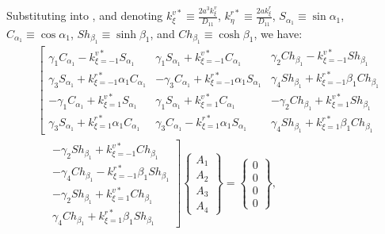 \documentclass[preprint,12pt,number]{elsarticle}
\begin{document}
Substituting  into , and denoting 
$k^{v*}_{\xi} \equiv \frac{2a^3 k^v_{\xi}}{D_{11}} $, 
$ k^{r*}_{\eta} \equiv \frac{2a k^r_{\xi}}{D_{11}} $, 
$ S_{\alpha_1} \equiv \sin \alpha_1 $, 
$ C_{\alpha_1} \equiv \cos \alpha_1 $, 
$ Sh_{\beta_1} \equiv \sinh \beta_1$, 
and $ Ch_{\beta_1} \equiv \cosh \beta_1 $, we have:
%
\begin{equation}\label{eq:ABx}
\begin{split}
	&\left[ \begin{array}{c}
		\gamma_1 C_{\alpha_1} - k^{v*}_{\xi=-1} S_{\alpha_1} \\ 
		\gamma_3 S_{\alpha_1} + k^{r*}_{\xi=-1} \alpha_1 C_{\alpha_1} \\ 
		-\gamma_1 C_{\alpha_1} + k^{v*}_{\xi=1} S_{\alpha_1} \\ 
		\gamma_3 S_{\alpha_1} + k^{r*}_{\xi=1} \alpha_1 C_{\alpha_1}
	\end{array} 
	\begin{array}{c}
		\gamma_1 S_{\alpha_1} + k^{v*}_{\xi=-1} C_{\alpha_1} \\ 
		-\gamma_3 C_{\alpha_1} + k^{r*}_{\xi=-1} \alpha_1 S_{\alpha_1} \\ 
		\gamma_1 S_{\alpha_1} + k^{v*}_{\xi=1} C_{\alpha_1} \\ 
		\gamma_3 C_{\alpha_1} - k^{r*}_{\xi=1} \alpha_1 S_{\alpha_1}
	\end{array} 
	\begin{array}{c}
		\gamma_2 Ch_{\beta_1} - k^{v*}_{\xi=-1} Sh_{\beta_1} \\ 
		\gamma_4 Sh_{\beta_1} + k^{r*}_{\xi=-1} \beta_1 Ch_{\beta_1} \\ 
		-\gamma_2 Ch_{\beta_1} + k^{v*}_{\xi=1} Sh_{\beta_1} \\ 
		\gamma_4 Sh_{\beta_1} + k^{r*}_{\xi=1} \beta_1 Ch_{\beta_1}
	\end{array} \right. \\ 
	&\quad
	\left. \begin{array}{c}
		-\gamma_2 Sh_{\beta_1} + k^{v*}_{\xi=-1} Ch_{\beta_1} \\ 
		-\gamma_4 Ch_{\beta_1} - k^{r*}_{\xi=-1} \beta_1 Sh_{\beta_1} \\ 
		-\gamma_2 Sh_{\beta_1} + k^{v*}_{\xi=1} Ch_{\beta_1} \\ 
		\gamma_4 Ch_{\beta_1} + k^{r*}_{\xi=1} \beta_1 Sh_{\beta_1}
	\end{array} \right] \begin{Bmatrix}
		A_1 \\ A_2 \\ A_3 \\ A_4
	\end{Bmatrix} =  \begin{Bmatrix}
		0 \\ 0 \\ 0 \\ 0
	\end{Bmatrix},
\end{split}
\end{equation}
\end{document}
